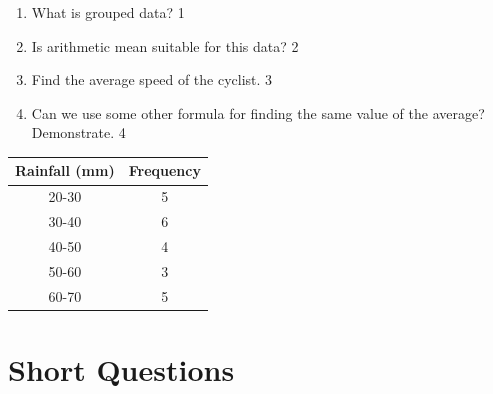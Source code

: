\documentclass[a4paper,oneside]{book}
\begin{document}
\begin{enumerate}
  \begin{enumerate}
    \item
	What is grouped data? \hfill 1
    \item
	Is arithmetic mean suitable for this data? \hfill 2
    \item  
	Find the average speed of the cyclist. \hfill 3
    \item
	Can we use some other formula for finding the same value of the average? Demonstrate. \hfill 4
  \end{enumerate}

    \begin{table}[h]
    \centering
\begin{tabular}{c|c}
\textbf{Rainfall (mm)} & \textbf{Frequency} \\ \hline
20-30                  & 5                  \\ \hline
30-40                  & 6                  \\ \hline
40-50                  & 4                  \\ \hline
50-60                  & 3                  \\
60-70                  & 5                 
\end{tabular}
\end{table}
\end{enumerate}

\section{Short Questions}
\end{document}
